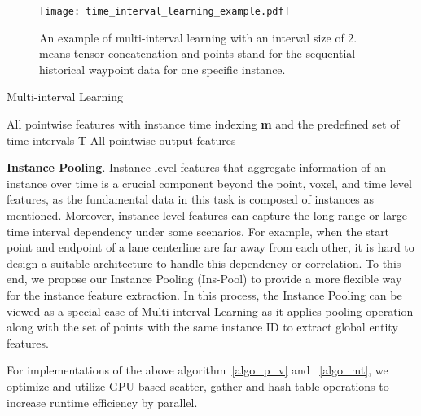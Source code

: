 \documentclass[final]{cvpr}
\begin{document}
\begin{figure}
    \centering
    \texttt{[image: time\_interval\_learning\_example.pdf]}
    \caption{An example of multi-interval learning with an interval size of 2.  means tensor concatenation and points stand for the sequential historical waypoint data for one specific instance.}
    \label{interval_learning_case}
\end{figure}

\begin{algorithm}[h]
   \caption{Multi-interval Learning}
   \begin{algorithmic}[1]
     \Require
     All pointwise features  with instance time indexing \textbf{m} and the predefined set of time intervals T
     \Ensure
    All pointwise output features 
\State 
\State 
\State 
      \State 
      \State 
      \State 
     \EndFor 
     \State\Return 
   \end{algorithmic}
   \label{algo_mt}
 \end{algorithm}

\textbf{Instance Pooling}. Instance-level features that aggregate information of an instance over time is a crucial component beyond the point, voxel, and time level features, as the fundamental data in this task is composed of instances as mentioned. 
Moreover, instance-level features can capture the long-range or large time interval dependency under some scenarios. For example, when the start point and endpoint of a lane centerline are  far away from each other, it is hard to design a suitable architecture to handle this dependency or correlation. To this end, we propose our Instance Pooling (Ins-Pool) to provide a more flexible way for the instance feature extraction. 
In this process, the Instance Pooling can be viewed as a special case of Multi-interval Learning as it applies pooling operation along with the set of points with the same instance ID to extract global entity features.      

For implementations of the above algorithm~\ref{algo_p_v} and ~\ref{algo_mt}, we optimize and utilize GPU-based scatter, gather and hash table operations to increase runtime efficiency by parallel. 
\end{document}

